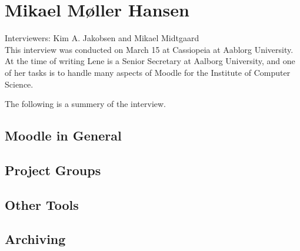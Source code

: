 
\section{Mikael Møller Hansen}
\label{sec:mikael}
Interviewers: Kim A. Jakobsen and Mikael Midtgaard\\


This interview was conducted on March 15\ths{} at Cassiopeia at Aablorg University.
At the time of writing Lene is a Senior Secretary at Aalborg University, and one of her tasks is to handle many aspects of Moodle for the Institute of Computer Science.

The following is a summery of the interview.

\subsection*{Moodle in General}


\subsection*{Project Groups}


\subsection*{Other Tools}


\subsection*{Archiving}
